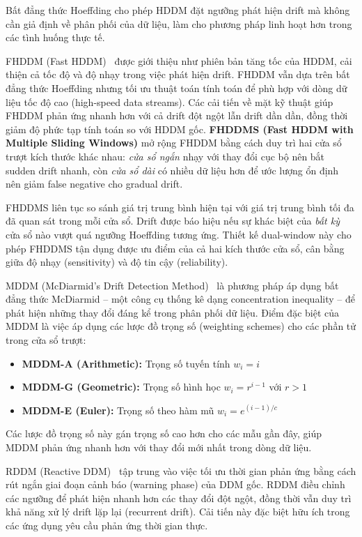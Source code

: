 Bất đẳng thức Hoeffding cho phép HDDM đặt ngưỡng phát hiện drift mà không cần giả định về phân phối của dữ liệu, làm cho phương pháp linh hoạt hơn
trong các tình huống thực tế.

FHDDM (Fast HDDM)~\cite{pesaranghader2016fhddm} được giới thiệu như phiên bản tăng tốc của HDDM, cải thiện cả tốc độ và độ nhạy trong việc phát hiện drift.
FHDDM vẫn dựa trên bất đẳng thức Hoeffding nhưng tối ưu thuật toán tính toán để phù hợp với dòng dữ liệu tốc độ cao (high-speed data streams).
Các cải tiến về mặt kỹ thuật giúp FHDDM phản ứng nhanh hơn với cả drift đột ngột lẫn drift dần dần, đồng thời giảm độ phức tạp tính toán so với HDDM gốc. \textbf{FHDDMS (Fast HDDM with Multiple Sliding Windows)} mở rộng FHDDM bằng cách duy trì hai cửa sổ trượt kích thước khác nhau: \textit{cửa sổ ngắn} nhạy với thay đổi cục bộ nên bắt sudden drift nhanh, còn \textit{cửa sổ dài} có nhiều dữ liệu hơn để ước lượng ổn định nên giảm false negative cho gradual drift.

FHDDMS liên tục so sánh giá trị trung bình hiện tại với giá trị trung bình tối đa đã quan sát trong mỗi cửa sổ. Drift được báo hiệu nếu sự khác
biệt của \textit{bất kỳ} cửa sổ nào vượt quá ngưỡng Hoeffding tương ứng. Thiết kế dual-window này cho phép FHDDMS tận dụng được ưu điểm của cả
hai kích thước cửa sổ, cân bằng giữa độ nhạy (sensitivity) và độ tin cậy (reliability).

MDDM (McDiarmid's Drift Detection Method)~\cite{pesaranghader2018mcdiarmid} là phương pháp áp dụng bất đẳng thức McDiarmid -- một công cụ thống kê dạng concentration inequality -- để phát hiện những thay đổi đáng kể trong phân phối dữ liệu. Điểm đặc biệt của MDDM là việc áp dụng các lược đồ trọng số (weighting schemes)
cho các phần tử trong cửa sổ trượt:
\begin{itemize}
	\item \textbf{MDDM-A (Arithmetic):} Trọng số tuyến tính $w_i = i$
	\item \textbf{MDDM-G (Geometric):} Trọng số hình học $w_i = r^{i-1}$ với $r > 1$
	\item \textbf{MDDM-E (Euler):} Trọng số theo hàm mũ $w_i = e^{(i-1)/c}$
\end{itemize}

Các lược đồ trọng số này gán trọng số cao hơn cho các mẫu gần đây, giúp MDDM phản ứng nhanh hơn với thay đổi mới nhất trong dòng dữ liệu.

RDDM (Reactive DDM)~\cite{barros2017rddm} tập trung vào việc tối ưu thời gian phản ứng bằng cách rút ngắn giai đoạn cảnh báo (warning phase) của DDM gốc.
RDDM điều chỉnh các ngưỡng để phát hiện nhanh hơn các thay đổi đột ngột, đồng thời vẫn duy trì khả năng xử lý drift lặp lại (recurrent drift).
Cải tiến này đặc biệt hữu ích trong các ứng dụng yêu cầu phản ứng thời gian thực.


